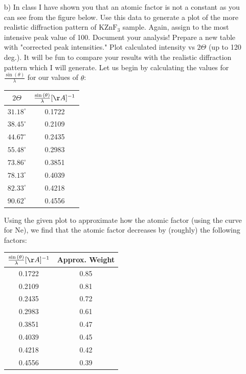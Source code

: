 \documentclass{article}
\begin{document}
\begin{enumerate}
    
    \item[b)] In class I have shown you that an atomic factor is not a constant as you can see from the figure below. Use this data to generate a plot of the more realistic diffraction pattern of $\text{KZnF}_3$ sample. Again, assign to the most intensive peak value of 100. Document your analysis! Prepare a new table with "corrected peak intensities." Plot calculated intensity vs $2\Theta$ (up to 120 deg.). It will be fun to compare your results with the realistic diffraction pattern which I will generate.
    \newline
    Let us begin by calculating the values for $\frac{\sin{(\theta)}}{\lambda}$ for our values of $\theta$:
    \begin{center}
    \begin{tabular}{c|c}
        $2\Theta$ & $\frac{\sin{(\theta)}}{\lambda} [\AA]^{-1}$ \\
        \hline 
        $31.18^{\circ}$ & 0.1722 \\
        $38.45^{\circ}$ & 0.2109 \\
        $44.67^{\circ}$ & 0.2435 \\
        $55.48^{\circ}$ & 0.2983 \\
        $73.86^{\circ}$ & 0.3851 \\
        $78.13^{\circ}$ & 0.4039 \\
        $82.33^{\circ}$ & 0.4218 \\
        $90.62^{\circ}$ & 0.4556 \\
    \end{tabular}
    \end{center}
    
    Using the given plot to approximate how the atomic factor (using the curve for Ne), we find that the atomic factor decreases by (roughly) the following factors:
    \begin{center}
        \begin{tabular}{c|c}
            $\frac{\sin{(\theta)}}{\lambda} [\AA]^{-1}$ & Approx. Weight \\
            \hline
            0.1722 & 0.85 \\
            0.2109 & 0.81 \\
            0.2435 & 0.72 \\
            0.2983 & 0.61 \\
            0.3851 & 0.47 \\
            0.4039 & 0.45 \\
            0.4218 & 0.42 \\
            0.4556 & 0.39 \\
        \end{tabular}
    \end{center}
    

\end{enumerate}
\end{document}
